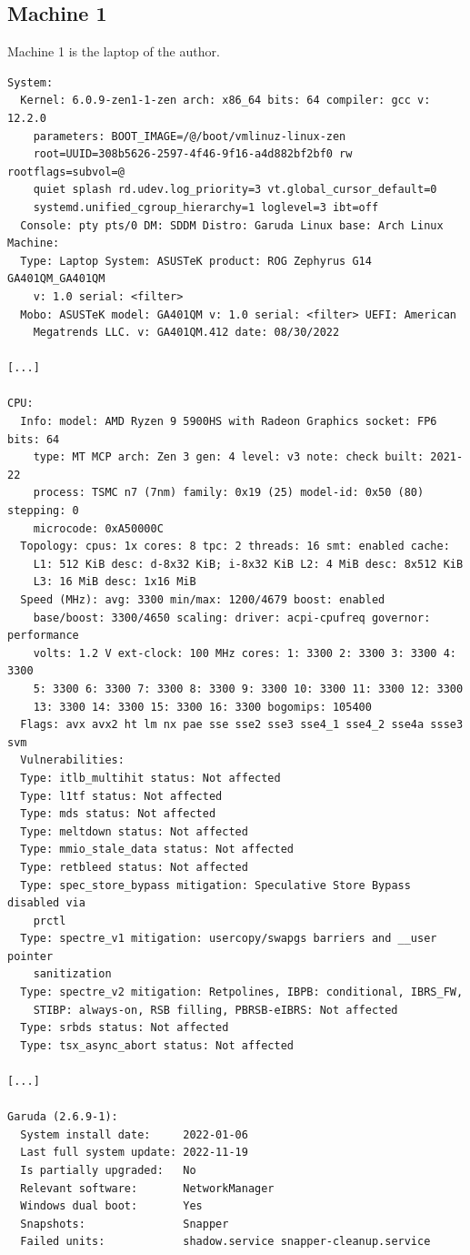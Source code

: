 \documentclass[11pt,DIV=10,final]{scrreprt} %
\begin{document}
\begin{appendix}
{\subsection{Machine 1}\label{specs:m1}
Machine 1 is the laptop of the author.
\begin{verbatim}
System:
  Kernel: 6.0.9-zen1-1-zen arch: x86_64 bits: 64 compiler: gcc v: 12.2.0
    parameters: BOOT_IMAGE=/@/boot/vmlinuz-linux-zen
    root=UUID=308b5626-2597-4f46-9f16-a4d882bf2bf0 rw rootflags=subvol=@
    quiet splash rd.udev.log_priority=3 vt.global_cursor_default=0
    systemd.unified_cgroup_hierarchy=1 loglevel=3 ibt=off
  Console: pty pts/0 DM: SDDM Distro: Garuda Linux base: Arch Linux
Machine:
  Type: Laptop System: ASUSTeK product: ROG Zephyrus G14 GA401QM_GA401QM
    v: 1.0 serial: <filter>
  Mobo: ASUSTeK model: GA401QM v: 1.0 serial: <filter> UEFI: American
    Megatrends LLC. v: GA401QM.412 date: 08/30/2022

[...]

CPU:
  Info: model: AMD Ryzen 9 5900HS with Radeon Graphics socket: FP6 bits: 64
    type: MT MCP arch: Zen 3 gen: 4 level: v3 note: check built: 2021-22
    process: TSMC n7 (7nm) family: 0x19 (25) model-id: 0x50 (80) stepping: 0
    microcode: 0xA50000C
  Topology: cpus: 1x cores: 8 tpc: 2 threads: 16 smt: enabled cache:
    L1: 512 KiB desc: d-8x32 KiB; i-8x32 KiB L2: 4 MiB desc: 8x512 KiB
    L3: 16 MiB desc: 1x16 MiB
  Speed (MHz): avg: 3300 min/max: 1200/4679 boost: enabled
    base/boost: 3300/4650 scaling: driver: acpi-cpufreq governor: performance
    volts: 1.2 V ext-clock: 100 MHz cores: 1: 3300 2: 3300 3: 3300 4: 3300
    5: 3300 6: 3300 7: 3300 8: 3300 9: 3300 10: 3300 11: 3300 12: 3300
    13: 3300 14: 3300 15: 3300 16: 3300 bogomips: 105400
  Flags: avx avx2 ht lm nx pae sse sse2 sse3 sse4_1 sse4_2 sse4a ssse3 svm
  Vulnerabilities:
  Type: itlb_multihit status: Not affected
  Type: l1tf status: Not affected
  Type: mds status: Not affected
  Type: meltdown status: Not affected
  Type: mmio_stale_data status: Not affected
  Type: retbleed status: Not affected
  Type: spec_store_bypass mitigation: Speculative Store Bypass disabled via
    prctl
  Type: spectre_v1 mitigation: usercopy/swapgs barriers and __user pointer
    sanitization
  Type: spectre_v2 mitigation: Retpolines, IBPB: conditional, IBRS_FW,
    STIBP: always-on, RSB filling, PBRSB-eIBRS: Not affected
  Type: srbds status: Not affected
  Type: tsx_async_abort status: Not affected

[...]

Garuda (2.6.9-1):
  System install date:     2022-01-06
  Last full system update: 2022-11-19
  Is partially upgraded:   No
  Relevant software:       NetworkManager
  Windows dual boot:       Yes
  Snapshots:               Snapper
  Failed units:            shadow.service snapper-cleanup.service
\end{verbatim}

}
\end{appendix}
\end{document}
